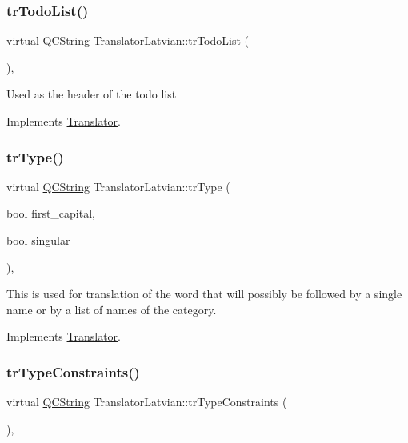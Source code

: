 \subsubsection{\texorpdfstring{trTodoList()}{trTodoList()}}
{\footnotesize\ttfamily virtual \mbox{\hyperlink{class_q_c_string}{Q\+C\+String}} Translator\+Latvian\+::tr\+Todo\+List (\begin{DoxyParamCaption}{ }\end{DoxyParamCaption})\hspace{0.3cm}{\ttfamily [inline]}, {\ttfamily [virtual]}}

Used as the header of the todo list 

Implements \mbox{\hyperlink{class_translator}{Translator}}.

\mbox{\label{class_translator_latvian_ac80e39a067a0cf072f746592efa1c3d8}} 
\subsubsection{\texorpdfstring{trType()}{trType()}}
{\footnotesize\ttfamily virtual \mbox{\hyperlink{class_q_c_string}{Q\+C\+String}} Translator\+Latvian\+::tr\+Type (\begin{DoxyParamCaption}\item[{bool}]{first\+\_\+capital,  }\item[{bool}]{singular }\end{DoxyParamCaption})\hspace{0.3cm}{\ttfamily [inline]}, {\ttfamily [virtual]}}

This is used for translation of the word that will possibly be followed by a single name or by a list of names of the category. 

Implements \mbox{\hyperlink{class_translator}{Translator}}.

\mbox{\label{class_translator_latvian_a802d19d5c6f488ac0d18ea3f734ee9fd}} 
\subsubsection{\texorpdfstring{trTypeConstraints()}{trTypeConstraints()}}
{\footnotesize\ttfamily virtual \mbox{\hyperlink{class_q_c_string}{Q\+C\+String}} Translator\+Latvian\+::tr\+Type\+Constraints (\begin{DoxyParamCaption}{ }\end{DoxyParamCaption})\hspace{0.3cm}{\ttfamily [inline]}, {\ttfamily [virtual]}}

